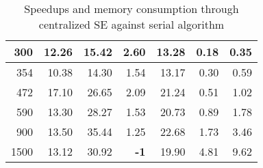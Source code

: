 \documentclass[thesis.tex]{subfiles}
\begin{document}
{\begin{table}[H]
\begin{tabular}{|r|r|r|r|r|r|r|}
		300                                                                                                   & {\color[HTML]{009901} 12.26}          & {\color[HTML]{009901} 15.42}       & {\color[HTML]{009901} 2.60}           & {\color[HTML]{009901} 13.28}       & 0.18                                  & 0.35                                  \\ \hline
		354                                                                                                   & {\color[HTML]{009901} 10.38}          & {\color[HTML]{009901} 14.30}       & {\color[HTML]{009901} 1.54}           & {\color[HTML]{009901} 13.17}       & 0.30                                  & 0.59                                  \\ \hline
		472                                                                                                   & {\color[HTML]{009901} 17.10}          & {\color[HTML]{009901} 26.65}       & {\color[HTML]{009901} 2.09}           & {\color[HTML]{009901} 21.24}       & 0.51                                  & 1.02                                  \\ \hline
		590                                                                                                   & {\color[HTML]{009901} 13.30}          & {\color[HTML]{009901} 28.27}       & {\color[HTML]{009901} 1.53}           & {\color[HTML]{009901} 20.73}       & 0.89                                  & 1.78                                  \\ \hline
		900                                                                                                   & {\color[HTML]{009901} 13.50}          & {\color[HTML]{009901} 35.44}       & {\color[HTML]{009901} 1.25}           & {\color[HTML]{009901} 22.68}       & 1.73                                  & 3.46                                  \\ \hline
		1500                                                                                                  & {\color[HTML]{009901} 13.12}          & {\color[HTML]{009901} 30.92}       & {\color[HTML]{CB0000} \textbf{-1}}    & {\color[HTML]{009901} 19.90}       & 4.81                                  & 9.62                                  \\ \hline
	\end{tabular}
	\caption{Speedups and memory consumption through centralized SE against serial algorithm}
	\label{table:centralizedSEsummary}
\end{table}}
\end{document}
